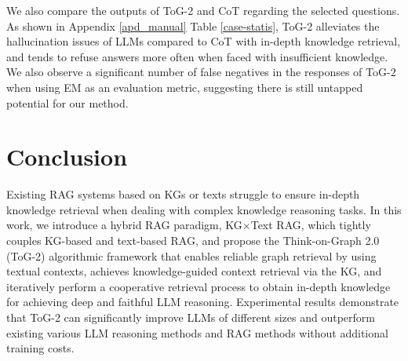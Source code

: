 \documentclass{article} %
\begin{document}
We also compare the outputs of ToG-2 and CoT regarding the selected questions. As shown in Appendix \ref{apd_manual} Table \ref{case-statis}, ToG-2 alleviates the hallucination issues of LLMs compared to CoT with in-depth knowledge retrieval, and tends to refuse answers more often when faced with insufficient knowledge. We also observe a significant number of false negatives in the responses of ToG-$2$ when using EM as an evaluation metric, suggesting there is still untapped potential for our method. 

\section{Conclusion}
Existing RAG systems based on KGs or texts struggle to ensure in-depth knowledge retrieval when dealing with complex knowledge reasoning tasks. In this work, we introduce a hybrid RAG paradigm, KG$\times$Text RAG, which tightly couples KG-based and text-based RAG,
and propose the Think-on-Graph 2.0 (ToG-2) algorithmic framework that enables reliable graph retrieval by using textual contexts, achieves knowledge-guided context retrieval via the KG, and iteratively perform a cooperative retrieval process to obtain in-depth knowledge for achieving deep and faithful LLM reasoning. Experimental results demonstrate that ToG-2 can significantly improve LLMs of different sizes and 
outperform existing various LLM reasoning methods and RAG methods without additional training costs.




\clearpage
\appendix
\end{document}

